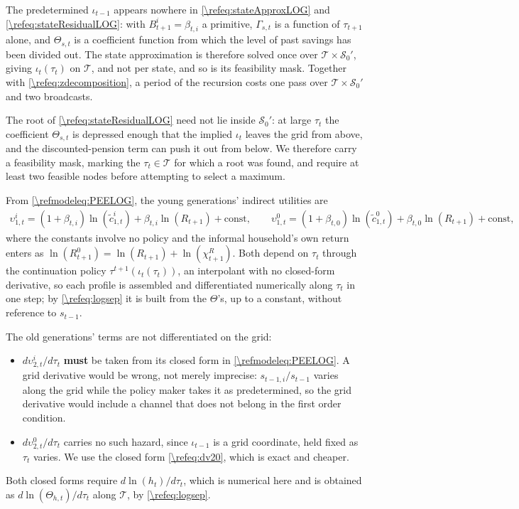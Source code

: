 The predetermined $\iota_{t-1}$ appears nowhere in \eqref{\refeq:stateApproxLOG} and \eqref{\refeq:stateResidualLOG}: with $B_{t+1}^i = \beta_{t,i}$ a primitive, $\Gamma_{s,t}$ is a function of $\tau_{t+1}$ alone, and $\Theta_{s,t}$ is a coefficient function from which the level of past savings has been divided out. The state approximation is therefore solved once over $\mathcal{T}\times\mathcal{S}_0'$, giving $\iota_t(\tau_t)$ on $\mathcal{T}$, and not per state, and so is its feasibility mask. Together with \eqref{\refeq:zdecomposition}, a period of the recursion costs one pass over $\mathcal{T}\times\mathcal{S}_0'$ and two broadcasts.

The root of \eqref{\refeq:stateResidualLOG} need not lie inside $\mathcal{S}_0'$: at large $\tau_t$ the coefficient $\Theta_{s,t}$ is depressed enough that the implied $\iota_t$ leaves the grid from above, and the discounted-pension term can push it out from below. We therefore carry a feasibility mask, marking the $\tau_t\in\mathcal{T}$ for which a root was found, and require at least two feasible nodes before attempting to select a maximum.

From \eqref{\refmodeleq:PEELOG}, the young generations' indirect utilities are
\begin{align}\label{\refeq:v1LOG}
    \upsilon_{1,t}^i = \left(1+\beta_{t,i}\right)\ln\left(\tilde{c}_{1,t}^i\right)+\beta_{t,i}\ln\left(R_{t+1}\right)+\text{const}, \qquad
    \upsilon_{1,t}^0 = \left(1+\beta_{t,0}\right)\ln\left(\tilde{c}_{1,t}^0\right)+\beta_{t,0}\ln\left(R_{t+1}\right)+\text{const},
\end{align}
where the constants involve no policy and the informal household's own return enters as $\ln(R_{t+1}^0) = \ln(R_{t+1})+\ln(\chi_{t+1}^R)$. Both depend on $\tau_t$ through the continuation policy $\tau^{t+1}\left(\iota_t(\tau_t)\right)$, an interpolant with no closed-form derivative, so each profile is assembled and differentiated numerically along $\tau_t$ in one step; by \eqref{\refeq:logsep} it is built from the $\Theta$'s, up to a constant, without reference to $s_{t-1}$.

The old generations' terms are not differentiated on the grid:
\begin{itemize}
    \item $d\upsilon_{2,t}^i/d\tau_t$ \textbf{must} be taken from its closed form in \eqref{\refmodeleq:PEELOG}. A grid derivative would be wrong, not merely imprecise: $s_{t-1,i}/s_{t-1}$ varies along the grid while the policy maker takes it as predetermined, so the grid derivative would include a channel that does not belong in the first order condition.
    \item $d\upsilon_{2,t}^0/d\tau_t$ carries no such hazard, since $\iota_{t-1}$ is a grid coordinate, held fixed as $\tau_t$ varies. We use the closed form \eqref{\refeq:dv20}, which is exact and cheaper.
\end{itemize}
Both closed forms require $d\ln(h_t)/d\tau_t$, which is numerical here and is obtained as $d\ln(\Theta_{h,t})/d\tau_t$ along $\mathcal{T}$, by \eqref{\refeq:logsep}.

